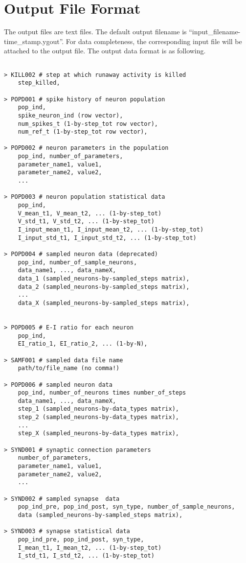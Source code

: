 \documentclass{article}
\begin{document}
\section{Output File Format}
The output files are text files.
The default output filename is ``input\_filename-time\_stamp.ygout''.
For data completeness, the corresponding input file will be attached to the output file.
The output data format is as following.
\begin{lstlisting}

> KILL002 # step at which runaway activity is killed
	step_killed,

> POPD001 # spike history of neuron population
	pop_ind,
	spike_neuron_ind (row vector),
	num_spikes_t (1-by-step_tot row vector),
	num_ref_t (1-by-step_tot row vector),

> POPD002 # neuron parameters in the population
	pop_ind, number_of_parameters,
	parameter_name1, value1,
	parameter_name2, value2,
	...

> POPD003 # neuron population statistical data
	pop_ind,
	V_mean_t1, V_mean_t2, ... (1-by-step_tot)
	V_std_t1, V_std_t2, ... (1-by-step_tot)
	I_input_mean_t1, I_input_mean_t2, ... (1-by-step_tot)
	I_input_std_t1, I_input_std_t2, ... (1-by-step_tot)
	
> POPD004 # sampled neuron data (deprecated)
	pop_ind, number_of_sample_neurons,
	data_name1, ..., data_nameX,
	data_1 (sampled_neurons-by-sampled_steps matrix),
	data_2 (sampled_neurons-by-sampled_steps matrix),
	...
	data_X (sampled_neurons-by-sampled_steps matrix),


> POPD005 # E-I ratio for each neuron
	pop_ind,
	EI_ratio_1, EI_ratio_2, ... (1-by-N),
	
> SAMF001 # sampled data file name
	path/to/file_name (no comma!)

> POPD006 # sampled neuron data
	pop_ind, number_of_neurons times number_of_steps
	data_name1, ..., data_nameX,
	step_1 (sampled_neurons-by-data_types matrix),
	step_2 (sampled_neurons-by-data_types matrix),
	...
	step_X (sampled_neurons-by-data_types matrix),
	
> SYND001 # synaptic connection parameters
	number_of_parameters,
	parameter_name1, value1,
	parameter_name2, value2,
	...

> SYND002 # sampled synapse  data
	pop_ind_pre, pop_ind_post, syn_type, number_of_sample_neurons,
	data (sampled_neurons-by-sampled_steps matrix),

> SYND003 # synapse statistical data
	pop_ind_pre, pop_ind_post, syn_type,
	I_mean_t1, I_mean_t2, ... (1-by-step_tot)
	I_std_t1, I_std_t2, ... (1-by-step_tot)
	
	

\end{lstlisting}

{}

\end{document}

